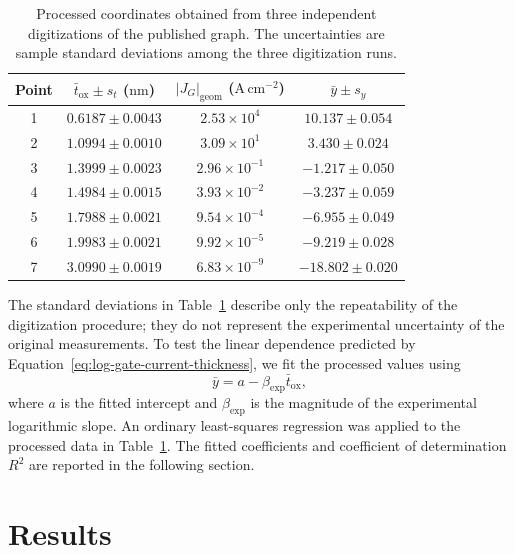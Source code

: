 \documentclass[12pt]{article}
\begin{document}
\begin{table}[H]
    \centering
    \small
    \caption{Processed coordinates obtained from three independent digitizations of the published graph. The uncertainties are sample standard deviations among the three digitization runs.}
    \label{tab:digitized-gate-leakage}
    \begin{tabular}{@{}cccc@{}}
        \toprule
        Point &
        \(\bar{t}_{\mathrm{ox}}\pm s_t\) (\(\mathrm{nm}\)) &
        \(\left|J_G\right|_{\mathrm{geom}}\) (\(\mathrm{A\,cm^{-2}}\)) &
        \(\bar{y}\pm s_y\) \\
        \midrule
        1 & \(0.6187\pm0.0043\) & \(2.53\times10^{4}\)  & \(10.137\pm0.054\) \\
        2 & \(1.0994\pm0.0010\) & \(3.09\times10^{1}\)  & \(3.430\pm0.024\)  \\
        3 & \(1.3999\pm0.0023\) & \(2.96\times10^{-1}\) & \(-1.217\pm0.050\) \\
        4 & \(1.4984\pm0.0015\) & \(3.93\times10^{-2}\) & \(-3.237\pm0.059\) \\
        5 & \(1.7988\pm0.0021\) & \(9.54\times10^{-4}\) & \(-6.955\pm0.049\) \\
        6 & \(1.9983\pm0.0021\) & \(9.92\times10^{-5}\) & \(-9.219\pm0.028\) \\
        7 & \(3.0990\pm0.0019\) & \(6.83\times10^{-9}\) & \(-18.802\pm0.020\) \\
        \bottomrule
    \end{tabular}
\end{table}

The standard deviations in Table~\ref{tab:digitized-gate-leakage} describe only the repeatability of the digitization procedure; they do not represent the experimental uncertainty of the original measurements. To test the linear dependence predicted by Equation~\eqref{eq:log-gate-current-thickness}, we fit the processed values using
\begin{equation}
    \bar{y}=a-\beta_{\mathrm{exp}}\bar{t}_{\mathrm{ox}},
    \label{eq:experimental-linear-fit}
\end{equation}
where \(a\) is the fitted intercept and \(\beta_{\mathrm{exp}}\) is the magnitude of the experimental logarithmic slope. An ordinary least-squares regression was applied to the processed data in Table~\ref{tab:digitized-gate-leakage}. The fitted coefficients and coefficient of determination \(R^2\) are reported in the following section.

\section{Results}
\end{document}
